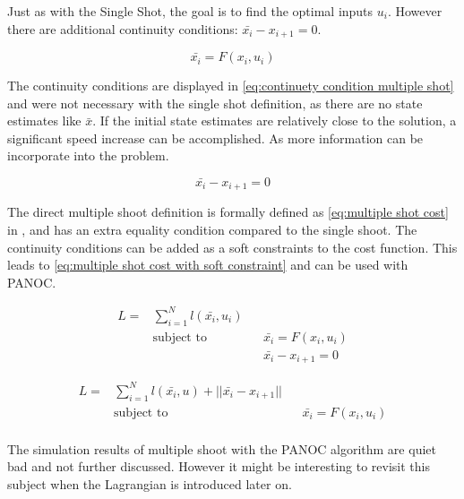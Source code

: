 			Just as with the Single Shot, the goal is to find the optimal inputs $u_i$. However there are additional continuity conditions: $\bar{x_i} - x_{i+1} = 0$.
			
			\begin{equation}
				\bar{x_i} = F(x_i,u_i)
				\label{eq:}
			\end{equation}
			
			The continuity conditions are displayed in \eqref{eq:continuety condition multiple shot} and were not necessary with the single shot definition, as there are no state estimates like $\bar{x}$. If the initial state estimates are relatively close to the solution, a significant speed increase can be accomplished. As more information can be incorporate into the problem.
			
			\begin{equation}
				\bar{x_i} - x_{i+1} = 0
				\label{eq:continuety condition multiple shot}
			\end{equation}
			
			The direct multiple shoot definition is formally defined as \eqref{eq:multiple shot cost} in \cite{Diehl2005}, and has an extra equality condition compared to the single shoot. The continuity conditions can be added as a soft constraints to the cost function. This leads to \eqref{eq:multiple shot cost with soft constraint} and can be used with PANOC.
			
			\begin{equation}
				\begin{aligned}
				L =  & \sum_{i=1}^{N} l(\bar{x_i},u_i) \\
				& \text{subject to}			&& \bar{x_i} = F(x_i,u_i) \\
				& 							&& \bar{x_i} - x_{i+1} = 0
				\end{aligned}
				\label{eq:multiple shot cost}
			\end{equation}
			
			\begin{equation}
			\begin{aligned}
			L =  & \sum_{i=1}^{N} l(\bar{x_i},u) + ||\bar{x_i} - x_{i+1}||\\
			& \text{subject to}			&& \bar{x_i} = F(x_i,u_i) \\
			\end{aligned}
			\label{eq:multiple shot cost with soft constraint}
			\end{equation}
			
			The simulation results of multiple shoot with the PANOC algorithm are quiet bad and not further discussed. However it might be interesting to revisit this subject when the Lagrangian is introduced later on.
